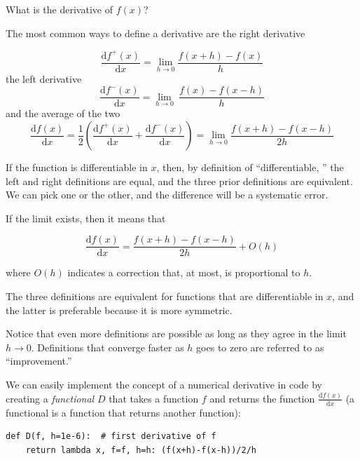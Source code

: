 \documentclass[justified, sixbynine]{tufte-book}
\def\ft{\small\tt}
\theoremstyle{plain}%
\newtheorem * {corollary}{Corollary}
\theoremstyle{definition}
\theoremstyle{remark}
\newtheorem * {remark}{Remark}
\newtheorem * {note}{Note}
\begin{document}
\begin{fullwidth}
What is the derivative of $f(x)$?

The most common ways to define a derivative are the right derivative

\begin{equation}
  \frac{\textrm{d}f^{+}(x)}{\textrm{d}x} = \lim_{h\rightarrow 0}
  \frac{f(x+h)-f(x)}{h}
\end{equation}
the left derivative
\begin{equation}
  \frac{\textrm{d}f^{-}(x)}{\textrm{d}x} = \lim_{h\rightarrow 0}\
  \frac{f(x)-f(x-h)}{h}
\end{equation}
and the average of the two
\begin{equation}
  \frac{\textrm{d}f(x)}{\textrm{d}x} = \frac12\left(
  \frac{\textrm{d}f^{+}(x)}{\textrm{d}x} +
  \frac{\textrm{d}f^{-}(x)}{\textrm{d}x} \right) =
  \lim_{h\rightarrow 0}\frac{f(x+h)-f(x-h)}{2h}
\end{equation}

If the function is differentiable in $x$, then, by definition of ``differentiable, '' the left and right definitions are equal, and the three prior definitions are equivalent. We can pick one or the other, and the difference will be a systematic error.

If the limit exists, then it means that

\begin{equation}
\frac{\textrm{d}f(x)}{\textrm{d}x} = \frac{f(x+h)-f(x-h)}{2h} + O(h)
\end{equation}

where $O(h)$ indicates a correction that, at most, is proportional to $h$.

The three definitions are equivalent for functions that are differentiable in $x$, and the latter is preferable because it is more symmetric.

Notice that even more definitions are possible as long as they agree in the limit $h\rightarrow 0$. Definitions that converge faster as $h$ goes to zero are referred to as ``improvement.''



We can easily implement the concept of a numerical derivative in code by creating a {\it functional} $D$ that takes a function $f$ and returns the function $\frac{\textrm{d}f(x)}{\textrm{d}x}$ (a functional is a function that returns another function):

\begin{lstlisting}[caption={in file: {\ft nlib.py}}]
def D(f, h=1e-6):  # first derivative of f
    return lambda x, f=f, h=h: (f(x+h)-f(x-h))/2/h
\end{lstlisting}


\end{fullwidth}
\end{document}

